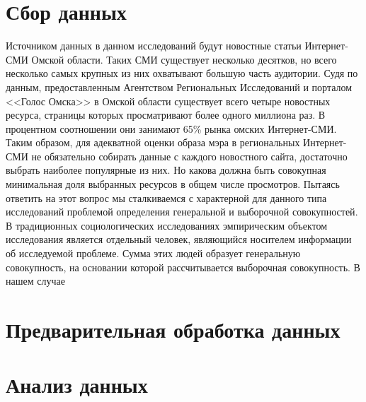 \section{Сбор данных} \label{sect2_2}
Источником данных в данном исследований будут новостные статьи Интернет-СМИ Омской области. Таких СМИ существует несколько десятков, но всего несколько самых крупных из них охватывают большую часть аудитории. Судя по данным, предоставленным Агентством Региональных Исследований\cite{ari_rating} и порталом <<Голос Омска>>\cite{golos_omska} в Омской области существует всего четыре новостных ресурса, страницы которых просматривают более одного миллиона раз. В процентном соотношении они занимают 65\% рынка омских Интернет-СМИ. Таким образом, для адекватной оценки образа мэра в региональных Интернет-СМИ не обязательно собирать данные с каждого новостного сайта, достаточно выбрать наиболее популярные из них.
Но какова должна быть совокупная минимальная доля выбранных ресурсов в общем числе просмотров. Пытаясь ответить на этот вопрос мы сталкиваемся с характерной для данного типа исследований проблемой определения генеральной и выборочной совокупностей\cite{methodlogy_internet}. В традиционных социологических исследованиях эмпирическим объектом исследования является отдельный человек, являющийся носителем информации об исследуемой проблеме. Сумма этих людей образует генеральную совокупность, на основании которой рассчитывается выборочная совокупность. В нашем случае
\section{Предварительная обработка данных} \label{sect2_2}
\section{Анализ данных}



\clearpage